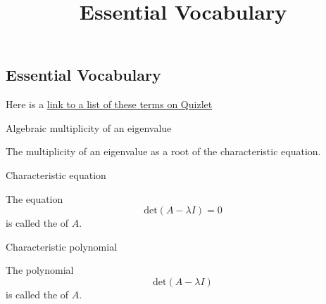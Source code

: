 \documentclass{ximera}
\title{Essential Vocabulary} \license{CC BY-NC-SA 4.0}
\begin{document}
\begin{abstract}
\end{abstract}
\maketitle


\begin{onlineOnly}
\section*{Essential Vocabulary}
Here is a  \href{https://quizlet.com/906040972/chapter-8-vocabulary-flash-cards/?i=y06sd&x=1jqt}{link to a list of these terms on Quizlet}
\end{onlineOnly}


Algebraic multiplicity of an eigenvalue
\begin{expandable}
    The multiplicity of an eigenvalue as a root of the characteristic equation.
\end{expandable}


Characteristic equation
\begin{expandable}
    The equation 
$$\mbox{det}(A-\lambda I) = 0$$ is called the  of $A$. 
\end{expandable}


Characteristic polynomial
\begin{expandable}
    The polynomial 
$$\mbox{det}(A-\lambda I)$$ is called the  of $A$. 
\end{expandable}

\end{document}
